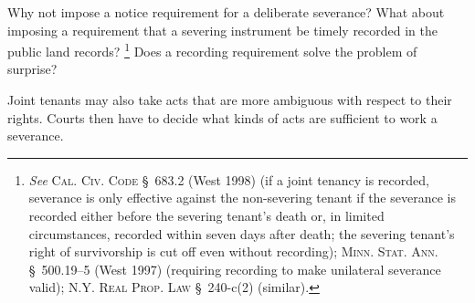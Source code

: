 Why not impose a notice requirement for a deliberate severance? What about
imposing a requirement that a severing instrument be timely recorded in the
public land records? \footnote{\emph{See} \textsc{Cal. Civ. Code} \S~683.2 (West
1998) (if a joint tenancy is recorded, severance is only effective against the
non-severing tenant if the severance is recorded either before the severing
tenant's death or, in limited circumstances, recorded within seven days after
death; the severing tenant's right of survivorship is cut off even without
recording); \textsc{Minn. Stat. Ann.} \S~500.19--5 (West 1997) (requiring
recording to make unilateral severance valid); \textsc{N.Y. Real Prop. Law}
\S~240-c(2) (similar).} Does a recording requirement solve the problem of
surprise?

Joint tenants may also take acts that are more ambiguous with respect to their
rights. Courts then have to decide what kinds of acts are sufficient to work a
severance.

